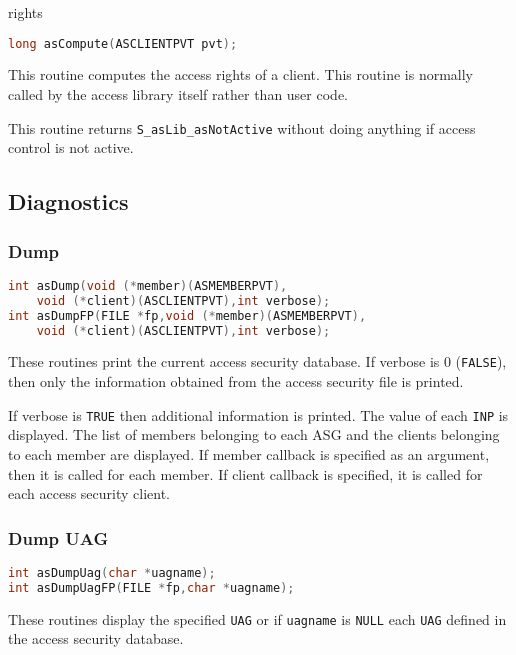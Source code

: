 rights

\begin{lstlisting}[language=C]
long asCompute(ASCLIENTPVT pvt); 
\end{lstlisting}

This routine computes the access rights of a client.
This routine is normally called by the access library itself rather than user code.

This routine returns \verb|S_asLib_asNotActive| without doing anything if access control is not active.

\subsection{Diagnostics}

\subsubsection{Dump}

\begin{lstlisting}[language=C]
int asDump(void (*member)(ASMEMBERPVT),
    void (*client)(ASCLIENTPVT),int verbose);
int asDumpFP(FILE *fp,void (*member)(ASMEMBERPVT),
    void (*client)(ASCLIENTPVT),int verbose);
\end{lstlisting}

These routines print the current access security database.
If verbose is 0 (\verb|FALSE|), then only the information obtained from the access security file is printed.

If verbose is \verb|TRUE| then additional information is printed.
The value of each \verb|INP| is displayed.
The list of members belonging to each ASG and the clients belonging to each member are displayed.
If member callback is specified as an argument, then it is called for each member.
If client callback is specified, it is called for each access security client.

\subsubsection{Dump UAG}

\begin{lstlisting}[language=C]
int asDumpUag(char *uagname);
int asDumpUagFP(FILE *fp,char *uagname);
\end{lstlisting}

These routines display the specified \verb|UAG| or if \verb|uagname| is \verb|NULL| each \verb|UAG| defined in the access security database.


